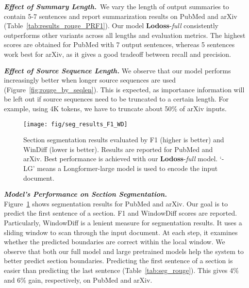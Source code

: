\documentclass[11pt]{article}
\begin{document}
\noindent\textbf{\textsl{Effect of Summary Length.}}\quad\,
We vary the length of output summaries to contain 5-7 sentences and report summarization results on PubMed and arXiv (Table~\ref{tab:results_rouge_PRF1}). 
Our model \textbf{Lodoss}-\emph{full} consistently outperforms other variants across all lengths and evaluation metrics.
The highest scores are obtained for PubMed with 7 output sentences, whereas
5 sentences work best for arXiv, as it gives a good tradeoff between recall and precision.




\vspace{0.05in}
\noindent\textbf{\textsl{Effect of Source Sequence Length.}}\quad
We observe that our model performs increasingly better 
when longer source sequences are used (Figure~\ref{fig:rouge_by_seqlen}).
This is expected, as importance information will be left out 
if source sequences need to be truncated to a certain length.
For example, using 4K tokens, we have to truncate about 50\% of arXiv inputs.




\begin{figure}[t]	
\centering
\texttt{[image: fig/seg\_results\_F1\_WD]}
\caption{Section segmentation results evaluated by F1 (higher is better) and WinDiff (lower is better). Results are reported for PubMed and arXiv. 
Best performance is achieved with our \textbf{Lodoss}-\emph{full} model.
`-LG' means a Longformer-large model is used to encode the input document.
}
\label{fig:seg_results}
\end{figure}



\vspace{0.05in}
\noindent\textbf{\textsl{Model's Performance on Section Segmentation.}}\\
Figure~\ref{fig:seg_results} shows segmentation results for PubMed and arXiv.
Our goal is to predict the first sentence of a section.
F1 and WindowDiff scores \cite{pevzner-hearst-2002-critique} are reported.
Particularly, WindowDiff is a lenient measure for segmentation results.
It uses a sliding window to scan through the input document.
At each step, it examines whether the predicted boundaries are correct within the local window.
We observe that both our full model and large pretrained models help the system to better predict section boundaries.
Predicting the first sentence of a section is easier than predicting the last sentence (Table~\ref{tab:seg_rouge}).
This gives 4\% and 6\% gain, respectively, on PubMed and arXiv.
\end{document}
